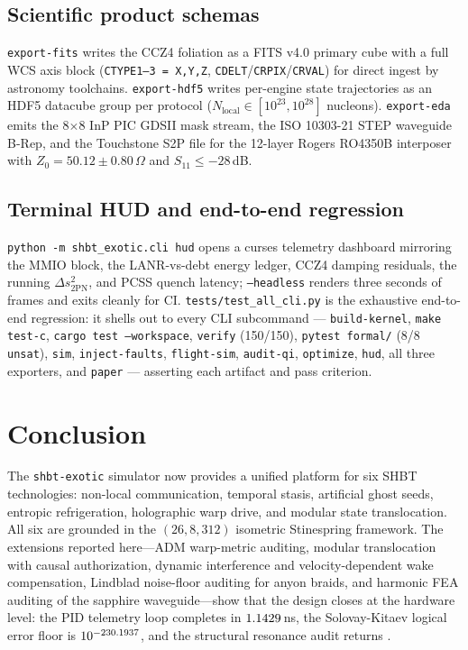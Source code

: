 \documentclass[aps,pra,10pt,onecolumn,superscriptaddress,nofootinbib,longbibliography,floatfix]{revtex4-2}
\newcommand{\ExoticInterposerZ}{50.12 \pm 0.80}%
\newcommand{\ExoticFormalStatus}{\texttt{unsat}}%
\begin{document}
\subsection{Scientific product schemas}

\texttt{export-fits} writes the CCZ4 foliation as a FITS v4.0 primary cube
with a full WCS axis block (\texttt{CTYPE1--3 = X,Y,Z},
\texttt{CDELT}/\texttt{CRPIX}/\texttt{CRVAL}) for direct ingest by astronomy
toolchains.  \texttt{export-hdf5} writes per-engine state trajectories as an
HDF5 datacube group per protocol
($N_{\mathrm{local}}\in[10^{23},10^{28}]$ nucleons).  \texttt{export-eda}
emits the 8$\times$8 InP PIC GDSII mask stream, the ISO 10303-21 STEP
waveguide B-Rep, and the Touchstone S2P file for the 12-layer Rogers
RO4350B interposer with $Z_0 = \ExoticInterposerZ\,\Omega$ and
$S_{11}\le -28$\,dB.

\subsection{Terminal HUD and end-to-end regression}

\texttt{python -m shbt\_exotic.cli hud} opens a curses telemetry dashboard
mirroring the MMIO block, the LANR-vs-debt energy ledger, CCZ4 damping
residuals, the running $\Delta s^2_{\mathrm{2PN}}$, and PCSS quench latency;
\texttt{--headless} renders three seconds of frames and exits cleanly for
CI.  \texttt{tests/test\_all\_cli.py} is the exhaustive end-to-end
regression: it shells out to every CLI subcommand --- \texttt{build-kernel},
\texttt{make test-c}, \texttt{cargo test --workspace}, \texttt{verify}
(150/150), \texttt{pytest formal/} (8/8 \ExoticFormalStatus), \texttt{sim},
\texttt{inject-faults}, \texttt{flight-sim}, \texttt{audit-qi},
\texttt{optimize}, \texttt{hud}, all three exporters, and \texttt{paper} ---
asserting each artifact and pass criterion.

\section{Conclusion}

The \texttt{shbt-exotic} simulator now provides a unified platform for six SHBT technologies: non-local communication, temporal stasis, artificial ghost seeds, entropic refrigeration, holographic warp drive, and modular state translocation.  All six are grounded in the $(26,8,312)$ isometric Stinespring framework.  The extensions reported here---ADM warp-metric auditing, modular translocation with causal authorization, dynamic interference and velocity-dependent wake compensation, Lindblad noise-floor auditing for anyon braids, and harmonic FEA auditing of the sapphire waveguide---show that the design closes at the hardware level: the PID telemetry loop completes in $1.1429\,$ns, the Solovay-Kitaev logical error floor is $10^{-230.1937}$, and the structural resonance audit returns \ExoticHarmonicStatus{}.
\end{document}
